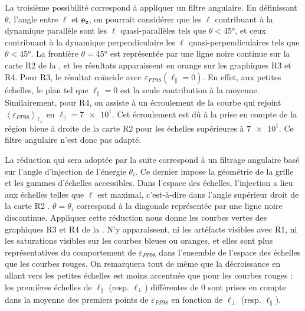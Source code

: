  La troisième possibilité correspond à appliquer un filtre angulaire. En définissant $\theta$, l'angle entre $\boldsymbol{\ell}$ et $\boldsymbol{e_z}$, on pourrait considérer que les $\boldsymbol{\ell}$ contribuant à la dynamique parallèle sont les $\boldsymbol{\ell}$ quasi-parallèles tels que $\theta < \ang{45}$, et ceux contribuant à la dynamique perpendiculaire les $\boldsymbol{\ell}$ quasi-perpendiculaires tels que $\theta < \ang{45}$. La frontière $\theta = \ang{45}$ est représentée par une ligne noire continue sur la carte R2 de la , et les résultats apparaissent en orange sur les graphiques R3 et R4. Pour R3, le résultat coïncide avec $\varepsilon_{PP98} (\ell_{\parallel} = 0)$. En effet, aux petites échelles, le plan tel que $\ell_{\parallel} = 0$ est la seule contribution à la moyenne. Similairement, pour R4, on assiste à un écroulement de la courbe qui rejoint $\left< \varepsilon_{PP98} \right>_{\ell_{\perp}}$ en $\ell_{\parallel} = \num{7e1}$. Cet écroulement est dû à la prise en compte de la région bleue à droite de la carte R2 pour les échelles supérieures à $\num{7e1}$. Ce filtre angulaire n'est donc pas adapté.
 
 La réduction  qui sera adoptée par la suite correspond à un filtrage angulaire basé sur l'angle d'injection de l'énergie $\theta_i$. Ce dernier impose la géométrie de la grille et les gammes d'échelles accessibles. Dans l'espace des échelles, l'injection a lieu aux échelles telles que $\ell$ est maximal, c'est-à-dire dans l'angle supérieur droit de la carte R2 . $\theta = \theta_i$ correspond à la diagonale représentée par une ligne noire discontinue. Appliquer cette réduction nous donne les courbes vertes des graphiques R3 et R4 de la . N'y apparaissent, ni les artéfacts visibles avec R1, ni les saturations visibles sur les courbes bleues ou oranges, et elles sont plus représentatives du comportement de $\varepsilon_{PP98}$ dans l'ensemble de l'espace des échelles que les courbes rouges. On remarquera tout de même que la décroissance en allant vers les petites échelles est moins accentuée que pour les courbes rouges : les premières échelles de $\ell_{\parallel}$ (resp. $\ell_{\perp}$) différentes de $\num{0}$ sont prises en compte dans la moyenne des premiers points de $\varepsilon_{PP98}$ en fonction de $\ell_{\perp}$ (resp. $\ell_{\parallel}$).
 
